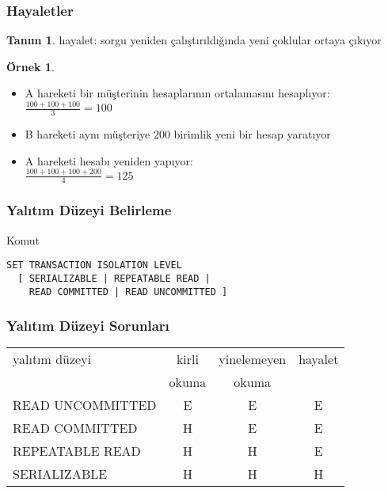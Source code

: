 \documentclass[dvipsnames]{beamer}
\theoremstyle{definition}
\newtheorem{tanim}[theorem]{Tanım}
\theoremstyle{example}
\newtheorem{ornek}[theorem]{Örnek}
\theoremstyle{plain}
\begin{document}
\begin{frame}
  \frametitle{Hayaletler}

  \begin{tanim}
    \alert{hayalet}: sorgu yeniden çalıştırıldığında yeni çoklular ortaya
      çıkıyor
  \end{tanim}

  \pause
  \begin{ornek}
    \begin{itemize}
      \item A hareketi bir müşterinin hesaplarının ortalamasını hesaplıyor:\\
        $\frac{100 + 100 + 100}{3}=100$

      \pause
      \item B hareketi aynı müşteriye $200$ birimlik yeni bir hesap yaratıyor
      \item A hareketi hesabı yeniden yapıyor:\\
        $\frac{100 + 100 + 100 + 200}{4}=125$
    \end{itemize}
  \end{ornek}
\end{frame}

\begin{frame}[fragile]
  \frametitle{Yalıtım Düzeyi Belirleme}

  \begin{block}{Komut}
    \begin{lstlisting}
SET TRANSACTION ISOLATION LEVEL
  [ SERIALIZABLE | REPEATABLE READ |
    READ COMMITTED | READ UNCOMMITTED ]
    \end{lstlisting}
  \end{block}
\end{frame}

\begin{frame}[fragile]
  \frametitle{Yalıtım Düzeyi Sorunları}

  \begin{table}
    \begin{tabular}{|l||c|c|c|}\hline
yalıtım düzeyi   & kirli & yinelemeyen & hayalet\\
                 & okuma & okuma       &        \\\hline\hline
READ UNCOMMITTED & E     & E           & E      \\\hline
READ COMMITTED   & H     & E           & E      \\\hline
REPEATABLE READ  & H     & H           & E      \\\hline
SERIALIZABLE     & H     & H           & H      \\\hline
    \end{tabular}
  \end{table}
\end{frame}
\end{document}
